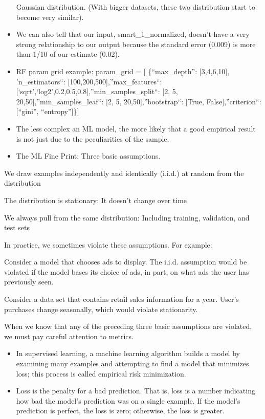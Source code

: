 \documentclass[]{book}
\theoremstyle{definition}
\theoremstyle{definition}
\theoremstyle{definition}
\theoremstyle{remark}
\begin{document}
\begin{itemize}
  Gaussian distribution. (With bigger datasets, these two distribution
  start to become very similar).
\item
  We can also tell that our input, smart\_1\_normalized, doesn't have a
  very strong relationship to our output because the standard error
  (0.009) is more than 1/10 of our estimate (0.02).
\item
  RF param grid example: param\_grid = {[} \{``max\_depth'':
  {[}3,4,6,10{]}, 'n\_estimators``: {[}100,200,500{]},''max\_features``:
  {[}`sqrt',`log2',0.2,0.5,0.8{]},''min\_samples\_split``: {[}2, 5,
  20,50{]},''min\_samples\_leaf``: {[}2, 5, 20,50{]},''bootstrap``:
  {[}True, False{]},''criterion``: {[}``gini'', ``entropy''{]}\}{]}
\item
  The less complex an ML model, the more likely that a good empirical
  result is not just due to the peculiarities of the sample.
\item
  The ML Fine Print: Three basic assumptions.
\end{itemize}

We draw examples independently and identically (i.i.d.) at random from
the distribution

The distribution is stationary: It doesn't change over time

We always pull from the same distribution: Including training,
validation, and test sets

In practice, we sometimes violate these assumptions. For example:

Consider a model that chooses ads to display. The i.i.d. assumption
would be violated if the model bases its choice of ads, in part, on what
ads the user has previously seen.

Consider a data set that contains retail sales information for a year.
User's purchases change seasonally, which would violate stationarity.

When we know that any of the preceding three basic assumptions are
violated, we must pay careful attention to metrics.

\begin{itemize}
\item
  In supervised learning, a machine learning algorithm builds a model by
  examining many examples and attempting to find a model that minimizes
  loss; this process is called empirical risk minimization.
\item
  Loss is the penalty for a bad prediction. That is, loss is a number
  indicating how bad the model's prediction was on a single example. If
  the model's prediction is perfect, the loss is zero; otherwise, the
  loss is greater.
\end{itemize}
\end{document}
